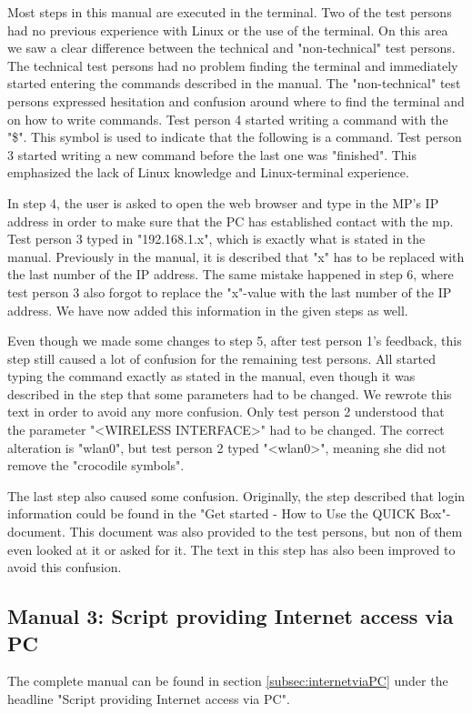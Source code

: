 Most steps in this manual are executed in the terminal. Two of the test persons had no previous experience with Linux or the use of the terminal. On this area we saw a clear difference between the technical and "non-technical" test persons. The technical test persons had no problem finding the terminal and immediately started entering the commands described in the manual. The "non-technical" test persons expressed hesitation and confusion around where to find the terminal and on how to write commands. Test person 4 started writing a command with the "\$". This symbol is used to indicate that the following is a command. Test person 3 started writing a new command before the last one was "finished". This emphasized the lack of Linux knowledge and Linux-terminal experience.   

In step 4, the user is asked to open the web browser and type in the MP's IP address in order to make sure that the PC has established contact with the \gls{mp}. Test person 3 typed in "192.168.1.x", which is exactly what is stated in the manual. Previously in the manual, it is described that "x" has to be replaced with the last number of the IP address. The same mistake happened in step 6, where test person 3 also forgot to replace the "x"-value with the last number of the IP address. We have now added this information in the given steps as well. 

Even though we made some changes to step 5, after test person 1's feedback, this step still caused a lot of confusion for the remaining test persons. All started typing the command exactly as stated in the manual, even though it was described in the step that some parameters had to be changed. We rewrote this text in order to avoid any more confusion. Only test person 2 understood that the parameter "<WIRELESS INTERFACE>" had to be changed. The correct alteration is "wlan0", but test person 2 typed "<wlan0>", meaning she did not remove the "crocodile symbols".

The last step also caused some confusion. Originally, the step described that login information could be found in the "Get started - How to Use the QUICK Box"-document. This document was also provided to the test persons, but non of them even looked at it or asked for it. The text in this step has also been improved to avoid this confusion.

\subsection{Manual 3: Script providing Internet access via PC}
The complete manual can be found in section \ref{subsec:internetviaPC} under the headline "Script providing Internet access via PC".

